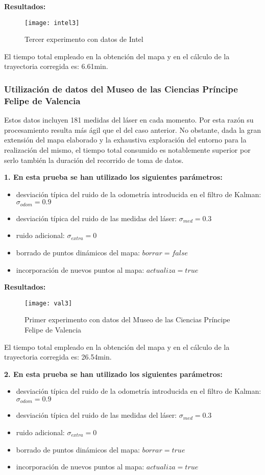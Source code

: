 \textbf{Resultados:}

\begin{figure}[h]
  \centering\texttt{[image: intel3]}\\
  \caption{Tercer experimento con datos de Intel}\label{fg:intel3}
\end{figure}

El tiempo total empleado en la obtención del mapa y en el cálculo de la trayectoria corregida es: 6.61min.

\subsubsection{Utilización de datos del Museo de las Ciencias Príncipe Felipe de Valencia}
Estos datos incluyen 181 medidas del láser en cada momento. Por esta razón su procesamiento resulta más ágil que el del caso anterior. No obstante, dada la gran extensión del mapa elaborado y la exhaustiva exploración del entorno para la realización del mismo, el tiempo total consumido es notablemente superior por serlo también la duración del recorrido de toma de datos.

\noindent
\textbf{\textbf{1.} En esta prueba se han utilizado los siguientes parámetros:}
\begin{itemize}
  \item desviación típica del ruido de la odometría introducida en el filtro de Kalman: $\sigma_{odom} = 0.9$
  \item desviación típica del ruido de las medidas del láser: $\sigma_{med} = 0.3$
  \item ruido adicional: $\sigma_{extra} = 0$
  \item borrado de puntos dinámicos del mapa: $borrar = false$
  \item incorporación de nuevos puntos al mapa: $actualiza = true$
\end{itemize}


\textbf{Resultados:}
\begin{figure}[h]
  \centering\texttt{[image: val3]}\\
  \caption{Primer experimento con datos del Museo de las Ciencias Príncipe Felipe de Valencia}\label{fg:val3}
\end{figure}

El tiempo total empleado en la obtención del mapa y en el cálculo de la trayectoria corregida es: 26.54min.


\noindent
\textbf{\textbf{2.} En esta prueba se han utilizado los siguientes parámetros:}
\begin{itemize}
  \item desviación típica del ruido de la odometría introducida en el filtro de Kalman: $\sigma_{odom} = 0.9$
  \item desviación típica del ruido de las medidas del láser: $\sigma_{med} = 0.3$
  \item ruido adicional: $\sigma_{extra} = 0$
  \item borrado de puntos dinámicos del mapa: $borrar = true$
  \item incorporación de nuevos puntos al mapa: $actualiza = true$
\end{itemize}


